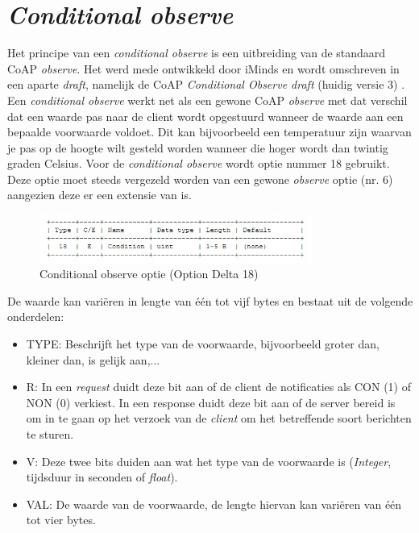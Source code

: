 \section{\textit{Conditional observe}}

Het principe van een \textit{conditional observe} is een uitbreiding van de standaard CoAP \textit{observe}. Het werd mede ontwikkeld door iMinds en wordt omschreven in een aparte \textit{draft}, namelijk de CoAP \textit{Conditional Observe draft} (huidig versie 3) \cite{coapConditionalObserveDraft}.\\

Een \textit{conditional observe} werkt net als een gewone CoAP \textit{observe} met dat verschil dat een waarde pas naar de client wordt opgestuurd wanneer de waarde aan een bepaalde voorwaarde voldoet. Dit kan bijvoorbeeld een temperatuur zijn waarvan je pas op de hoogte wilt gesteld worden wanneer die hoger wordt dan twintig graden Celsius.
Voor de \textit{conditional observe} wordt optie nummer 18 gebruikt. Deze optie moet steeds vergezeld worden van een gewone \textit{observe} optie (nr. 6) aangezien deze er een extensie van is.

\begin{figure}[h!]
\centering
\includegraphics[width=0.8\textwidth]{fig/conditional}
\caption{Conditional observe optie (Option Delta 18)}
\end{figure}

De waarde kan vari\"{e}ren in lengte van \'{e}\'{e}n tot vijf bytes en bestaat uit de volgende onderdelen:
\begin{itemize}
\item TYPE: Beschrijft het type van de voorwaarde, bijvoorbeeld groter dan, kleiner dan, is gelijk aan,...
\item R: In een \textit{request} duidt deze bit aan of de client de notificaties als CON (1) of NON (0) verkiest. In een response duidt deze bit aan of de server bereid is om in te gaan op het verzoek van de \textit{client} om het betreffende soort berichten te sturen.
\item V: Deze twee bits duiden aan wat het type van de voorwaarde is (\textit{Integer}, tijdsduur in seconden of \textit{float}).
\item VAL: De waarde van de voorwaarde, de lengte hiervan kan vari\"{e}ren van \'{e}\'{e}n tot vier bytes.
\end{itemize}


